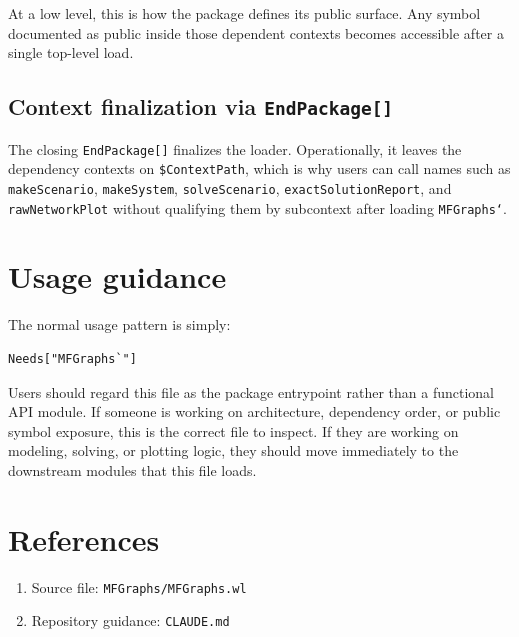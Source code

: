 \documentclass[11pt]{article}
\begin{document}
At a low level, this is how the package defines its public surface. Any symbol documented as public inside those dependent contexts becomes accessible after a single top-level load.

\subsection*{Context finalization via \texttt{EndPackage[]}}

{\sloppy
The closing \texttt{EndPackage[]} finalizes the loader. Operationally, it leaves the dependency contexts on \texttt{\$ContextPath}, which is why users can call names such as \texttt{makeScenario}, \texttt{makeSystem}, \texttt{solveScenario}, \texttt{exactSolutionReport}, and \texttt{rawNetworkPlot} without qualifying them by subcontext after loading \texttt{MFGraphs`}.\par}

\section{Usage guidance}

The normal usage pattern is simply:

\begin{verbatim}
Needs["MFGraphs`"]
\end{verbatim}

Users should regard this file as the package entrypoint rather than a functional API module. If someone is working on architecture, dependency order, or public symbol exposure, this is the correct file to inspect. If they are working on modeling, solving, or plotting logic, they should move immediately to the downstream modules that this file loads.

\section*{References}

\begin{enumerate}
\item Source file: \texttt{MFGraphs/MFGraphs.wl}
\item Repository guidance: \texttt{CLAUDE.md}
\end{enumerate}
\end{document}

